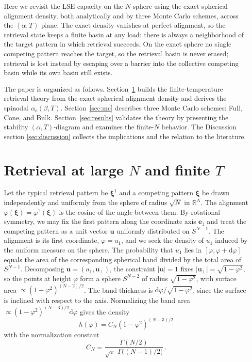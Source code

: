 \documentclass[letterpaper]{article} %
\newcommand{\bxi}{\boldsymbol{\xi}}
\newcommand{\dd}{{\mathrm{d}}}
\newcommand{\Bnet}{\beta}
\begin{document}
Here we revisit the LSE capacity on the $N$-sphere using the exact spherical alignment density, both analytically and by three Monte Carlo schemes, across the $(\alpha, T)$ plane. The exact density vanishes at perfect alignment, so the retrieval state keeps a finite basin at any load: there is always a neighborhood of the target pattern in which retrieval succeeds. On the exact sphere no single competing pattern reaches the target, so the retrieval basin is never erased; retrieval is lost instead by escaping over a barrier into the collective competing basin while its own basin still exists.

The paper is organized as follows. Section~\ref{sec:theory} builds the
finite-temperature retrieval theory from the exact spherical alignment density and derives the spinodal $\alpha_c(\Bnet, T)$. Section~\ref{sec:mc} describes three
Monte Carlo schemes: Full, Cone, and Bulk. Section~\ref{sec:results} validates the theory by presenting the stability $(\alpha, T)$-diagram and examines the finite-$N$ behavior. The Discussion section \ref{sec:discussion} collects the implications and the relation to the literature.



\section{Retrieval at large $N$ and finite $T$}
\label{sec:theory}

Let the typical retrieval pattern be $\bxi^1$ and a competing pattern $\bxi$ be drawn independently and uniformly from the sphere of radius $\sqrt N$ in $\mathbb{R}^N$. The alignment $\varphi(\bxi) = \varphi^1(\bxi)$ is the cosine of the angle between them. 
By rotational symmetry, we may fix the first pattern along the coordinate axis $\bm e_1$ and treat the competing pattern as a unit vector $\bm u$ uniformly distributed on $S^{N-1}$. The alignment is its first coordinate, $\varphi=u_1$, and we seek the density of $u_1$ induced by the uniform measure on the sphere. The probability that $u_1$ lies in $[\varphi,\varphi+\dd\varphi]$ equals the area of the corresponding spherical band divided by the total area of $S^{N-1}$. Decomposing $\bm u=(u_1,\bm u_\perp)$, the constraint $|\bm u|=1$ fixes $|\bm u_\perp|=\sqrt{1-\varphi^2}$, so the points at height 
$\varphi$ form a sphere $S^{N-2}$ of radius $\sqrt{1-\varphi^2}$, with surface area $\propto (1-\varphi^2)^{(N-2)/2}$. The band thickness is $\dd\varphi/\sqrt{1-\varphi^2}$, since the surface is inclined with respect to the axis. Normalizing the band area
$\propto(1-\varphi^2)^{(N-3)/2}\dd\varphi$ gives the density
\begin{equation}
h(\varphi)=C_N(1-\varphi^2)^{(N-3)/2}
\label{eq:exact_density}
\end{equation}
with the normalization constant
\begin{equation}
C_N=\frac{\Gamma(N/2)}{\sqrt\pi\;\Gamma\!\big((N-1)/2\big)}\,.
\end{equation}
\end{document}
